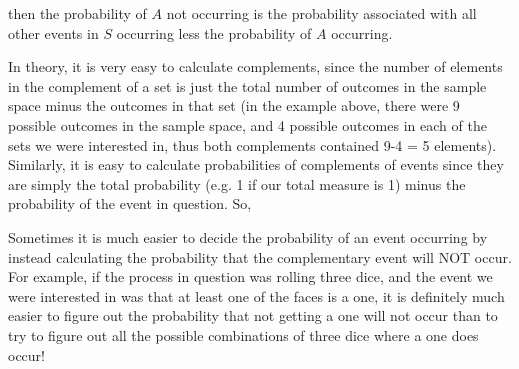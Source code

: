 then the probability of $A$ not
occurring is the probability associated with all other events in $S$ occurring less the probability of
$A$ occurring.\par \label{m39377*eip-788}In
theory, it is very easy to calculate complements, since the number of elements
in the complement of a set is just the total number of outcomes in the sample
space minus the outcomes in that set (in the example above, there were 9
possible outcomes in the sample space, and 4 possible outcomes in each of the
sets we were interested in, thus both complements contained 9-4 = 5 elements).
Similarly, it is easy to calculate probabilities of complements of events since
they are simply the total probability (e.g. 1 if our total measure is 1) minus the probability of the event in question. So,\par \label{m39377*eip-936}\nopagebreak\noindent{}
      \label{m39377*eip-836}Sometimes it is much easier to decide the probability of an event occurring by instead calculating the probability that the complementary event will NOT occur. For example, if the process in question was rolling three dice, and the event we were interested in was that at least one of the faces is a one, it is definitely much easier to figure out the probability that not getting a one will not occur than to try to figure out all the possible combinations of three dice where a one does occur!\par \label{m39377*eip-549}\vspace{.5cm} 
